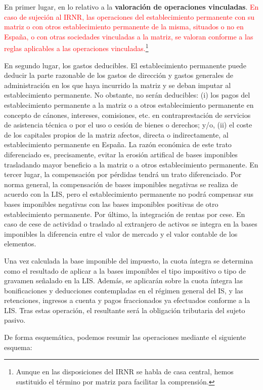\documentclass[10pt,a4paper]{article}
\begin{document}
En primer lugar, en lo relativo a la \textbf{valoración de operaciones vinculadas}. \textcolor{red}{En caso de sujeción al IRNR, las operaciones del establecimiento permanente con su matriz o con otros establecimiento permanente de la misma, situados o no en España, o con otras sociedades vinculadas a la matriz, se valoran conforme a las reglas aplicables a las operaciones vinculadas.}\footnote{%
    Aunque en las disposiciones del IRNR se habla de casa central, hemos sustituido el término por matriz para facilitar la comprensión.
}

En segundo lugar, los gastos deducibles. El establecimiento permanente puede deducir la parte razonable de los gastos de dirección y gastos generales de administración en los que haya incurrido la matriz y se deban imputar al establecimiento permanente. No obstante, no serán deducibles: (i) los pagos del establecimiento permanente a la matriz o a otros establecimiento permanente en concepto de cánones, intereses, comisiones, etc. en contraprestación de servicios de asistencia técnica o por el uso o cesión de bienes o derechos; y/o, (ii) el coste de los capitales propios de la matriz afectos, directa o indirectamente, al establecimiento permanente en España. La razón económica de este trato diferenciado es, precisamente, evitar la erosión artifical de bases imponibles trasladando mayor beneficio a la matriz o a otros establecimiento permanente. En tercer lugar, la compensación por pérdidas tendrá un trato diferenciado. Por norma general, la compensación de bases imponibles negativas se realiza de acuerdo con la LIS, pero el establecimiento permanente no podrá compensar sus bases imponibles negativas con las bases imponibles positivas de otro establecimiento permanente. Por último, la integración de rentas por cese. En caso de cese de actividad o traslado al extranjero de activos se integra en la bases imponibles la diferencia entre el valor de mercado y el valor contable de los elementos.

Una vez calculada la base imponible del impuesto, la cuota íntegra se determina como el resultado de aplicar a la bases imponibles el tipo impositivo o tipo de gravamen señalado en la LIS. Además, se aplicarán sobre la cuota íntegra las bonificaciones y deducciones contempladas en el régimen general del IS, y las retenciones, ingresos a cuenta y pagos fraccionados ya efectuados conforme a la LIS. Tras estas operación, el resultante será la obligación tributaria del sujeto pasivo. 


De forma esquemática, podemos resumir las operaciones mediante el siguiente esquema:
\end{document}

